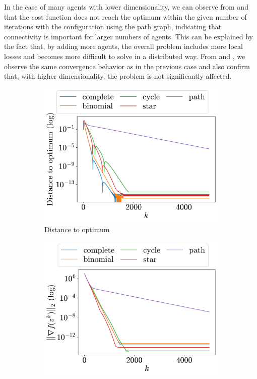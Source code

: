 \documentclass[a4paper,11pt,oneside]{book}
\begin{document}
In the case of many agents with lower dimensionality, we can observe from  and  that the cost function does not reach the optimum within the given number of iterations with the configuration using the path graph, indicating that connectivity is important for larger numbers of agents. This can be explained by the fact that, by adding more agents, the overall problem includes more local losses and becomes more difficult to solve in a distributed way. From  and , we observe the same convergence behavior as in the previous case and also confirm that, with higher dimensionality, the problem is not significantly affected.


\begin{figure}[H]
      \centering
      \begin{subfigure}[t]{0.46\linewidth}
            \centering
            \includegraphics[width=\linewidth]{./figs/quadratic/15_3/distance.pdf} 
            \caption{Distance to optimum}
      \end{subfigure}
      \hfill
      \begin{subfigure}[t]{0.46\linewidth}
            \centering
            \includegraphics[width=\linewidth]{./figs/quadratic/15_3/gradient.pdf} 

\end{subfigure}
\end{figure}
\end{document}
